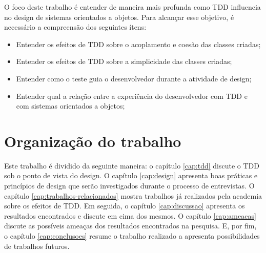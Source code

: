 O foco deste trabalho é entender de maneira mais profunda como TDD influencia no
design de sistemas orientados a objetos. Para alcançar esse objetivo, é necessário a
compreensão dos seguintes ítens:

\begin{itemize}
  \item Entender os efeitos de TDD sobre o acoplamento e coesão das classes
  criadas;

  \item Entender os efeitos de TDD sobre a simplicidade das classes criadas;

  \item Entender como o teste guia o desenvolvedor durante a atividade de
  design;

  \item Entender qual a relação entre a experiência do desenvolvedor com TDD e
  com sistemas orientados a objetos;
\end{itemize}

\section{Organização do trabalho}

Este trabalho é dividido da seguinte maneira: o capítulo \ref{cap:tdd} discute o
TDD sob o ponto de vista do design. O capítulo \ref{cap:design} apresenta boas
práticas e princípios de design que serão investigados durante o processo de
entrevistas. O capítulo \ref{cap:trabalhos-relacionados} mostra trabalhos já
realizados pela academia sobre os efeitos de TDD. Em seguida, o capítulo
\ref{cap:discussao} apresenta os resultados encontrados e discute em cima dos
mesmos. O capítulo \ref{cap:ameacas} discute as possíveis ameaças dos resultados
encontrados na pesquisa. E, por fim, o capítulo \ref{cap:conclusoes} resume o
trabalho realizado a apresenta possibilidades de trabalhos futuros.
